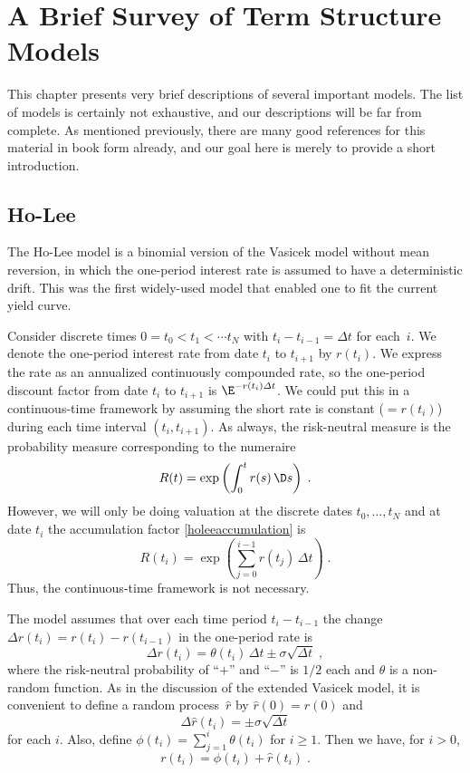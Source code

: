 \chapter{A Brief Survey of Term Structure Models}\label{c_survey}
This chapter presents very brief descriptions of several important models.  The list of models is certainly not exhaustive, and our descriptions will be far from complete.   As mentioned previously, there are many good references for this material in book form already, and our goal here is merely to provide a short introduction.

\section{Ho-Lee}
The Ho-Lee \cite{HL} model is a binomial version of the Vasicek model without mean reversion, in which the one-period interest rate is assumed to have a deterministic drift.  This was the first widely-used model that enabled one to fit the current yield curve.  

Consider discrete times $0=t_0 < t_1 < \cdots t_N$ with $t_{i}-t_{i-1}=\varDelta t$ for each~$i$.  We denote the one-period interest rate from date $t_i$ to $t_{i+1}$ by $r(t_i)$.  We express the rate as an annualized continuously compounded rate, so the one-period discount factor from date $t_i$ to $t_{i+1}$ is $\E^{-r(t_i) \varDelta t}$.  We could put this in a continuous-time framework by assuming the short rate is constant ($= r(t_i)$) during each time interval $(t_i, t_{i+1})$.  As always, the risk-neutral measure is the probability measure corresponding to the numeraire
\begin{equation}\label{holeeaccumulation}
R(t) = \exp\left(\int_0^t r(s)\,\D s\right)\; .
\end{equation}
However, we will only be doing valuation at the discrete dates $t_0, \ldots, t_N$ and at date $t_i$ the accumulation factor \eqref{holeeaccumulation} is
$$R(t_i) = \exp\left(\sum_{j=0}^{i-1} r(t_{j})\,\varDelta t\right)\; .$$
Thus, the continuous-time framework is not necessary.



The model assumes that over each time period $t_{i}-t_{i-1}$ the change $\varDelta r(t_i) = r(t_i)-r(t_{i-1})$ in the one-period rate is 
$$ \varDelta r(t_i) = \theta(t_i)\,\varDelta t \pm \sigma \sqrt{\varDelta t}\; ,$$
 where the risk-neutral probability of ``$+$'' and ``$-$'' is $1/2$ each and $\theta$ is a non-random function.  
  As in the discussion of the extended Vasicek model, it is convenient to define a random process~$\hat{r}$ by $\hat{r}(0) = r(0)$ and 
 $$\varDelta \hat{r}(t_i) = \pm \sigma \sqrt{\varDelta t}$$
 for each $i$.  Also, define $\phi(t_i) = \sum_{j=1}^i \theta(t_i)$ for $i \geq 1$.  Then we have, for $i >0$,
 $$r(t_i) = \phi(t_i) + \hat{r}(t_i)\; .$$  


